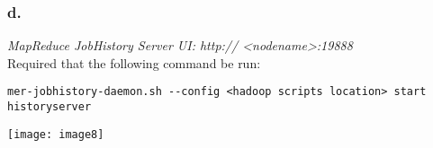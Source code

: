 \documentclass[]{article}
\begin{document}
\subsubsection*{d.}
\emph{MapReduce JobHistory Server UI: http:// <nodename>:19888} \\
Required that the following command be run: \\
\begin{verbatim}
mer-jobhistory-daemon.sh --config <hadoop scripts location> start historyserver
\end{verbatim}
\texttt{[image: image8]} \vspace{-1.5em}
\end{document}
